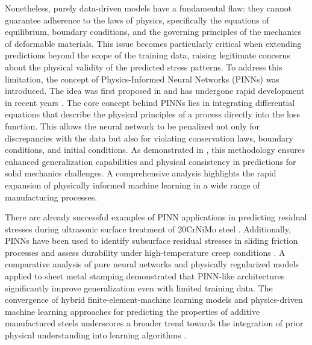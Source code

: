 \documentclass[subscriptcorrection,upint,varvw,barcolor=Goldenrod3,mathalfa=cal=euler,balance,hyphenate,french,pdf-a]{asmejour} %
\begin{document}
Nonetheless, purely data-driven models have a fundamental flaw: they cannot guarantee adherence to the laws of physics, specifically the equations of equilibrium, boundary conditions, and the governing principles of the mechanics of deformable materials. This issue becomes particularly critical when extending predictions beyond the scope of the training data, raising legitimate concerns about the physical validity of the predicted stress patterns.
To address this limitation, the concept of Physics-Informed Neural Networks (PINNs) was introduced. The idea was first proposed in \citep{raissi2019physics} and has undergone rapid development in recent years \citep{karniadakis2021physics}. The core concept behind PINNs lies in integrating differential equations that describe the physical principles of a process directly into the loss function. This allows the neural network to be penalized not only for discrepancies with the data but also for violating conservation laws, boundary conditions, and initial conditions.
As demonstrated in \citep{haghighat2021physics}, this methodology ensures enhanced generalization capabilities and physical consistency in predictions for solid mechanics challenges. A comprehensive analysis \citep{ra2026physics} highlights the rapid expansion of physically informed machine learning in a wide range of manufacturing processes.

There are already successful examples of PINN applications in predicting residual stresses during ultrasonic surface treatment of 20CrNiMo steel \citep{yang2025prediction}. Additionally, PINNs have been used to identify subsurface residual stresses in sliding friction processes \citep{mehedihasan2026inverse, hasan2025machining} and assess durability under high-temperature creep conditions \citep{muransky2026application}. A comparative analysis of pure neural networks and physically regularized models applied to sheet metal stamping \citep{munzone2024comparative} demonstrated that PINN-like architectures significantly improve generalization even with limited training data. The convergence of hybrid finite-element-machine learning models and physics-driven machine learning approaches for predicting the properties of additive manufactured steels underscores a broader trend towards the integration of prior physical understanding into learning algorithms \citep{laakso2024hybrid, rahman2025physics}.
\end{document}
